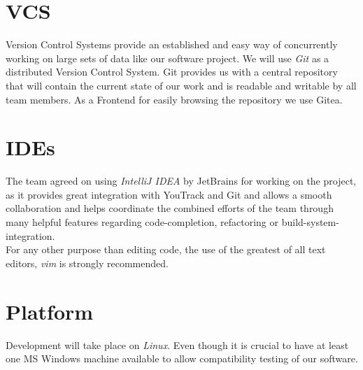\documentclass{scrreprt}
\begin{document}
\section{VCS}
Version Control Systems provide an established and easy way of concurrently working on
large sets of data like our software project. We will use \emph{Git} as a distributed Version
Control System. Git provides us with a central repository that will contain the current
state of our work and is readable and writable by all team members. As a Frontend for
easily browsing the repository we use Gitea. \\


\section{IDEs}
\label{devops-ide}
The team agreed on using \emph{IntelliJ IDEA} by JetBrains for working on the project, as it
provides great integration with YouTrack and Git and allows a smooth collaboration and helps coordinate the combined efforts of the team through many helpful
features regarding code-completion, refactoring or build-system-integration. \\
For any other purpose than editing code, the use of the greatest of all text editors, \emph{vim} is strongly recommended.

\section{Platform}
Development will take place on \emph{Linux}. Even though it is crucial to have at least
one MS Windows machine available to allow compatibility testing of our software.
\end{document}
